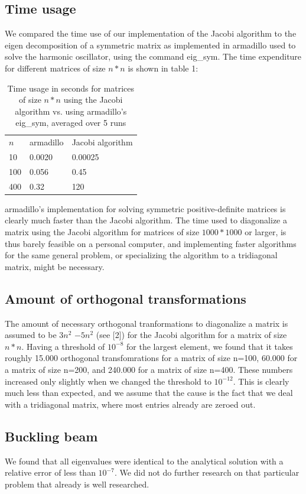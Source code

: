 \documentclass[10pt,a4paper]{article}
\begin{document}
\subsection{Time usage}
We compared the time use of our implementation of the Jacobi algorithm to the eigen decomposition of a symmetric matrix as implemented in armadillo used to solve the harmonic oscillator, using the command eig\_sym. The time expenditure for different matrices of size $n*n$ is shown in table 1:
\begin{table}[H]
\caption[Comparison of time use for algorithms]{Time usage in seconds for matrices of size $n*n$ using the Jacobi algorithm vs. using armadillo's eig\_sym, averaged over 5 runs}
\begin{tabular}{lll}
$n$ &  armadillo & Jacobi algorithm \\
 10 & 0.0020 & 0.00025 \\
 100 & 0.056 & 0.45\\
 400 & 0.32 & 120
\end{tabular}
\end{table}
armadillo's implementation for solving symmetric positive-definite matrices is clearly much faster than the Jacobi algorithm. The time used to diagonalize a matrix  using the Jacobi algorithm for matrices of size $1000*1000$ or larger, is thus barely feasible on a personal computer, and implementing faster algorithms for the same general problem, or specializing the algorithm to a tridiagonal matrix, might be necessary. 
\subsection{Amount of orthogonal transformations}
The amount of necessary orthogonal tranformations to diagonalize a matrix is assumed to be $3n^2$ −$5n^2$ (see [2]) for the Jacobi algorithm for a matrix of size $n*n$. Having a threshold of $10^{-8}$ for the largest element, we found that it takes roughly 15.000 orthogonal transfomrations for a matrix of size n=100, 60.000 for a matrix of size n=200, and 240.000 for a matrix of size n=400. These numbers increased only slightly when we changed the threshold to $10^{-12}$. This is clearly much less than expected, and we assume that the cause is the fact that we deal with a tridiagonal matrix, where most entries already are zeroed out. 
\subsection{Buckling beam}
We found that all eigenvalues were identical to the analytical solution with a relative error of less than $10^{-7}$. We did not do further research on that particular problem that already is well researched.
\end{document}
